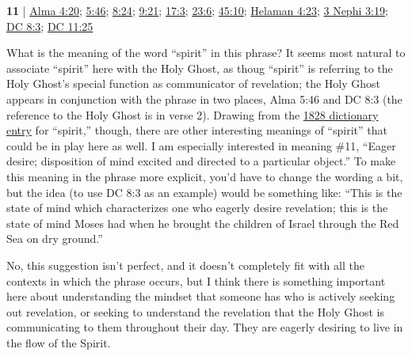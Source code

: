 \begin{compactdesc}
		\item[spirit of revelation] \textbf{11} | \hyperref[ALMA-4-20]{Alma 4:20}; \hyperref[ALMA-5-46]{5:46}; \hyperref[ALMA-8-24]{8:24}; \hyperref[ALMA-9-21]{9:21}; \hyperref[ALMA-17-3]{17:3}; \hyperref[ALMA-23-6]{23:6}; \hyperref[ALMA-45-10]{45:10}; \hyperref[HELAMAN-4-23]{Helaman 4:23}; \hyperref[3NEPHI-3-19]{3 Nephi 3:19}; \hyperref[DC8-3]{DC 8:3}; \hyperref[DC11-25]{DC 11:25}
			\begin{compactdesc}
				\item[Commentary] What is the meaning of the word ``spirit'' in this phrase? It seems most natural to associate ``spirit'' here with the Holy Ghost, as thoug ``spirit'' is referring to the Holy Ghost's special function as communicator of revelation; the Holy Ghost appears in conjunction with the phrase in two places, Alma 5:46 and DC 8:3 (the reference to the Holy Ghost is in verse 2). Drawing from the \hyperref[SPIRIT-1828]{1828 dictionary entry} for ``spirit,'' though, there are other interesting meanings of ``spirit'' that could be in play here as well. I am especially interested in meaning \#11, ``Eager desire; disposition of mind excited and directed to a particular object.'' To make this meaning in the phrase more explicit, you'd have to change the wording a bit, but the idea (to use DC 8:3 as an example) would be something like: ``This is the state of mind which characterizes one who eagerly desire revelation; this is the state of mind Moses had when he brought the children of Israel through the Red Sea on dry ground.''
				
				No, this suggestion isn't perfect, and it doesn't completely fit with all the contexts in which the phrase occurs, but I think there is something important here about understanding the mindset that someone has who is actively seeking out revelation, or seeking to understand the revelation that the Holy Ghost is communicating to them throughout their day. They are eagerly desiring to live in the flow of the Spirit.
			\end{compactdesc}
			

\end{compactdesc}
